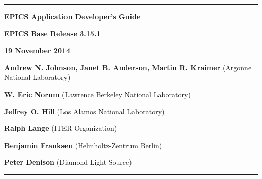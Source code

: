 \hrule

\vspace{1in}

\noindent \Huge \textbf{EPICS Application Developer's Guide}

\vspace{0.5in}

\noindent \Large \textbf{EPICS Base Release 3.15.1}

\noindent \textbf{19 November 2014}

\vspace{0.5in}

\normalsize
\noindent \textbf{Andrew N. Johnson, Janet B. Anderson, Martin R. Kraimer} (Argonne National Laboratory)

\noindent \textbf{W. Eric Norum} (Lawrence Berkeley National Laboratory)

\noindent \textbf{Jeffrey O. Hill} (Los Alamos National Laboratory)

\noindent \textbf{Ralph Lange} (ITER Organization)

\noindent \textbf{Benjamin Franksen} (Helmholtz-Zentrum Berlin)

\noindent \textbf{Peter Denison} (Diamond Light Source)

\vspace{1in}
\hrule
